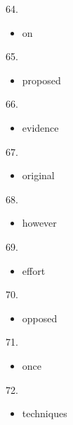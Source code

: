 \documentclass[UTF8,11pt]{ctexart}
\begin{document}
64.


\begin{itemize}[leftmargin=2em,itemsep=.2em,topsep=.4em]\item[B.] on
\end{itemize}

65.


\begin{itemize}[leftmargin=2em,itemsep=.2em,topsep=.4em]\item[A.] proposed
\end{itemize}

66.


\begin{itemize}[leftmargin=2em,itemsep=.2em,topsep=.4em]\item[D.] evidence
\end{itemize}

67.


\begin{itemize}[leftmargin=2em,itemsep=.2em,topsep=.4em]\item[B.] original
\end{itemize}

68.


\begin{itemize}[leftmargin=2em,itemsep=.2em,topsep=.4em]\item[A.] however
\end{itemize}

69.


\begin{itemize}[leftmargin=2em,itemsep=.2em,topsep=.4em]\item[C.] effort
\end{itemize}

70.


\begin{itemize}[leftmargin=2em,itemsep=.2em,topsep=.4em]\item[C.] opposed
\end{itemize}

71.


\begin{itemize}[leftmargin=2em,itemsep=.2em,topsep=.4em]\item[D.] once
\end{itemize}

72.


\begin{itemize}[leftmargin=2em,itemsep=.2em,topsep=.4em]\item[D.] techniques
\end{itemize}
\end{document}
